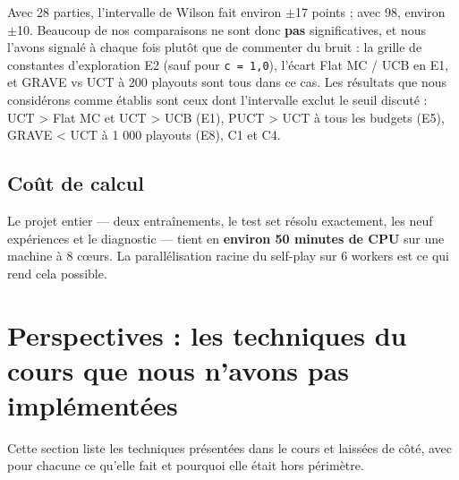 \documentclass[11pt,a4paper]{article}
\begin{document}
Avec 28 parties, l'intervalle de Wilson fait environ $\pm$17 points ; avec 98, environ
$\pm$10. Beaucoup de nos comparaisons ne sont donc \textbf{pas} significatives, et nous
l'avons signalé à chaque fois plutôt que de commenter du bruit : la grille de
constantes d'exploration E2 (sauf pour \texttt{c\ =\ 1,0}), l'écart Flat MC / UCB en E1, et
GRAVE vs UCT à 200 playouts sont tous dans ce cas. Les résultats que nous
considérons comme établis sont ceux dont l'intervalle exclut le seuil discuté :
UCT \textgreater{} Flat MC et UCT \textgreater{} UCB (E1), PUCT \textgreater{} UCT à tous les budgets (E5), GRAVE \textless{} UCT à
1 000 playouts (E8), C1 et C4.

\subsection{Coût de calcul}\label{couxfbt-de-calcul}

Le projet entier --- deux entraînements, le test set résolu exactement, les neuf
expériences et le diagnostic --- tient en \textbf{environ 50 minutes de CPU} sur une
machine à 8 cœurs. La parallélisation racine du self-play sur 6 workers est ce qui
rend cela possible.

\section{Perspectives : les techniques du cours que nous n'avons pas implémentées}\label{perspectives-les-techniques-du-cours-que-nous-navons-pas-impluxe9mentuxe9es}

Cette section liste les techniques présentées dans le cours et laissées de côté,
avec pour chacune ce qu'elle fait et pourquoi elle était hors périmètre.
\end{document}
